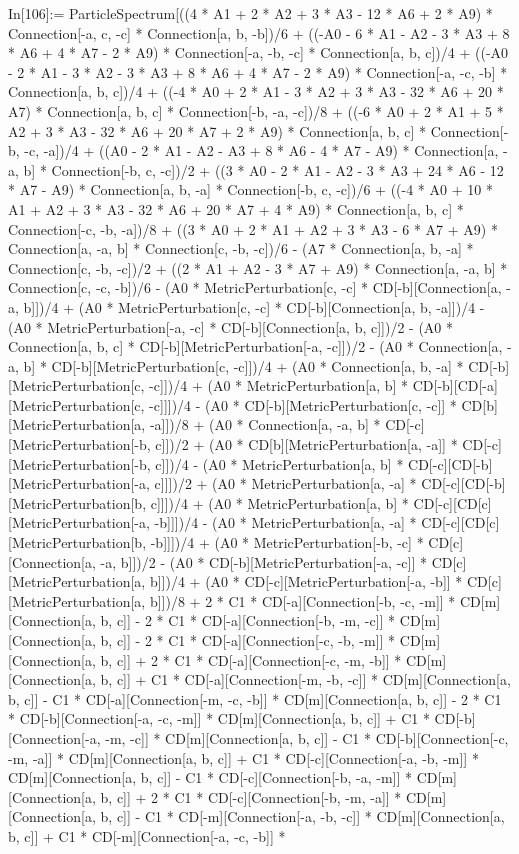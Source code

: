 In[106]:= ParticleSpectrum[((4 * A1 + 2 * A2 + 3 * A3 - 12 * A6 + 2 * A9) * Connection[-a, c, -c] * Connection[a, b, -b])/6 + ((-A0 - 6 * A1 - A2 - 3 * A3 + 8 * A6 + 4 * A7 - 2 * A9) * Connection[-a, -b, -c] * Connection[a, b, c])/4 + ((-A0 - 2 * A1 - 3 * A2 - 3 * A3 + 8 * A6 + 4 * A7 - 2 * A9) * Connection[-a, -c, -b] * Connection[a, b, c])/4 + ((-4 * A0 + 2 * A1 - 3 * A2 + 3 * A3 - 32 * A6 + 20 * A7) * Connection[a, b, c] * Connection[-b, -a, -c])/8 + ((-6 * A0 + 2 * A1 + 5 * A2 + 3 * A3 - 32 * A6 + 20 * A7 + 2 * A9) * Connection[a, b, c] * Connection[-b, -c, -a])/4 + ((A0 - 2 * A1 - A2 - A3 + 8 * A6 - 4 * A7 - A9) * Connection[a, -a, b] * Connection[-b, c, -c])/2 + ((3 * A0 - 2 * A1 - A2 - 3 * A3 + 24 * A6 - 12 * A7 - A9) * Connection[a, b, -a] * Connection[-b, c, -c])/6 + ((-4 * A0 + 10 * A1 + A2 + 3 * A3 - 32 * A6 + 20 * A7 + 4 * A9) * Connection[a, b, c] * Connection[-c, -b, -a])/8 + ((3 * A0 + 2 * A1 + A2 + 3 * A3 - 6 * A7 + A9) * Connection[a, -a, b] * Connection[c, -b, -c])/6 - (A7 * Connection[a, b, -a] * Connection[c, -b, -c])/2 + ((2 * A1 + A2 - 3 * A7 + A9) * Connection[a, -a, b] * Connection[c, -c, -b])/6 - (A0 * MetricPerturbation[c, -c] * CD[-b][Connection[a, -a, b]])/4 + (A0 * MetricPerturbation[c, -c] * CD[-b][Connection[a, b, -a]])/4 - (A0 * MetricPerturbation[-a, -c] * CD[-b][Connection[a, b, c]])/2 - (A0 * Connection[a, b, c] * CD[-b][MetricPerturbation[-a, -c]])/2 - (A0 * Connection[a, -a, b] * CD[-b][MetricPerturbation[c, -c]])/4 + (A0 * Connection[a, b, -a] * CD[-b][MetricPerturbation[c, -c]])/4 + (A0 * MetricPerturbation[a, b] * CD[-b][CD[-a][MetricPerturbation[c, -c]]])/4 - (A0 * CD[-b][MetricPerturbation[c, -c]] * CD[b][MetricPerturbation[a, -a]])/8 + (A0 * Connection[a, -a, b] * CD[-c][MetricPerturbation[-b, c]])/2 + (A0 * CD[b][MetricPerturbation[a, -a]] * CD[-c][MetricPerturbation[-b, c]])/4 - (A0 * MetricPerturbation[a, b] * CD[-c][CD[-b][MetricPerturbation[-a, c]]])/2 + (A0 * MetricPerturbation[a, -a] * CD[-c][CD[-b][MetricPerturbation[b, c]]])/4 + (A0 * MetricPerturbation[a, b] * CD[-c][CD[c][MetricPerturbation[-a, -b]]])/4 - (A0 * MetricPerturbation[a, -a] * CD[-c][CD[c][MetricPerturbation[b, -b]]])/4 + (A0 * MetricPerturbation[-b, -c] * CD[c][Connection[a, -a, b]])/2 - (A0 * CD[-b][MetricPerturbation[-a, -c]] * CD[c][MetricPerturbation[a, b]])/4 + (A0 * CD[-c][MetricPerturbation[-a, -b]] * CD[c][MetricPerturbation[a, b]])/8 + 2 * C1 * CD[-a][Connection[-b, -c, -m]] * CD[m][Connection[a, b, c]] - 2 * C1 * CD[-a][Connection[-b, -m, -c]] * CD[m][Connection[a, b, c]] - 2 * C1 * CD[-a][Connection[-c, -b, -m]] * CD[m][Connection[a, b, c]] + 2 * C1 * CD[-a][Connection[-c, -m, -b]] * CD[m][Connection[a, b, c]] + C1 * CD[-a][Connection[-m, -b, -c]] * CD[m][Connection[a, b, c]] - C1 * CD[-a][Connection[-m, -c, -b]] * CD[m][Connection[a, b, c]] - 2 * C1 * CD[-b][Connection[-a, -c, -m]] * CD[m][Connection[a, b, c]] + C1 * CD[-b][Connection[-a, -m, -c]] * CD[m][Connection[a, b, c]] - C1 * CD[-b][Connection[-c, -m, -a]] * CD[m][Connection[a, b, c]] + C1 * CD[-c][Connection[-a, -b, -m]] * CD[m][Connection[a, b, c]] - C1 * CD[-c][Connection[-b, -a, -m]] * CD[m][Connection[a, b, c]] + 2 * C1 * CD[-c][Connection[-b, -m, -a]] * CD[m][Connection[a, b, c]] - C1 * CD[-m][Connection[-a, -b, -c]] * CD[m][Connection[a, b, c]] + C1 * CD[-m][Connection[-a, -c, -b]] * 